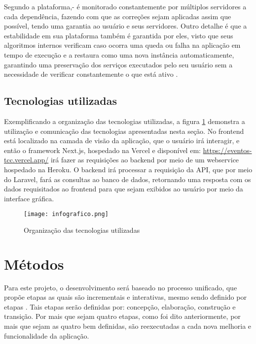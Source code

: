 Segundo a plataforma,- é monitorado constantemente por múltiplos servidores a cada dependência, fazendo com que as correções sejam aplicadas assim que possível, tendo uma garantia ao usuário e seus servidores.  Outro detalhe é que a estabilidade em sua plataforma também é garantida por eles, visto que seus algoritmos internos verificam caso ocorra uma queda ou falha na aplicação em tempo de execução e a restaura como uma nova instância automaticamente, garantindo uma preservação dos serviços executados pelo seu usuário sem a necessidade de verificar constantemente o que está ativo \cite{HEROKU}.

\subsection{Tecnologias utilizadas}
Exemplificando a organização das tecnologias utilizadas, a figura \ref{info} demonstra a utilização e comunicação das tecnologias apresentadas nesta seção. No frontend está localizado na camada de visão da aplicação, que o usuário irá interagir, e então o framework Next.js, hospedado na Vercel e disponível em: \url{https://eventos-tcc.vercel.app/} irá fazer as requisições ao backend por meio de um webservice hospedado na Heroku. O backend irá processar a requisição da API, que por meio do Laravel, fará as consultas ao banco de dados, retornando uma resposta com os dados requisitados ao frontend para que sejam exibidos ao usuário por meio da interface gráfica.

\begin{figure}[H]
    \caption{\label{info}Organização das tecnologias utilizadas}
    \vspace{5pt}
    \centering
    \texttt{[image: infografico.png]}
    \vspace{5pt}
\end{figure}


\section{Métodos} \label{metodos}
Para este projeto, o desenvolvimento será baseado no processo unificado, que propõe etapas as quais são incrementais e interativas, mesmo sendo definido por etapas \cite{UNIFICADO}. Tais etapas serão definidas por: concepção, elaboração, construção e transição. Por mais que sejam quatro etapas, como foi dito anteriormente, por mais que sejam as quatro bem definidas, são reexecutadas a cada nova melhoria e funcionalidade da aplicação.

